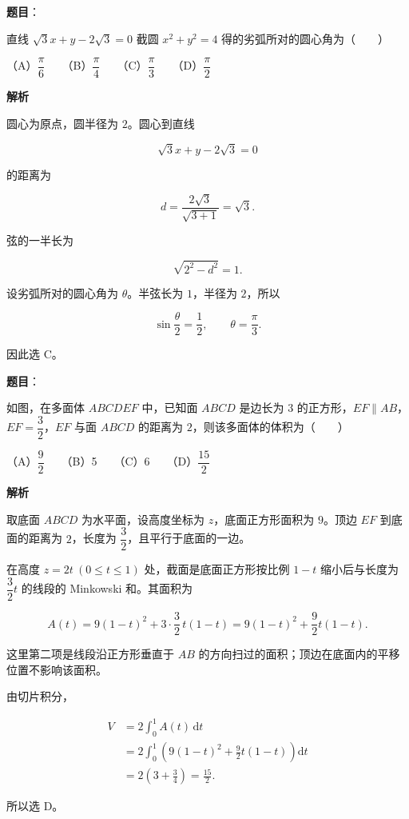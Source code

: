\begin{answer}

\textbf{题目}：

直线 $\sqrt3x+y-2\sqrt3=0$ 截圆 $x^2+y^2=4$ 得的劣弧所对的圆心角为\mbox{（　　）}

（A）$\dfrac\pi6$　　（B）$\dfrac\pi4$　　（C）$\dfrac\pi3$　　（D）$\dfrac\pi2$

\textbf{解析}

圆心为原点，圆半径为 $2$。圆心到直线

\nopagebreak[4]
\[
\sqrt3x+y-2\sqrt3=0
\]

的距离为

\nopagebreak[4]
\[
d=\frac{2\sqrt3}{\sqrt{3+1}}=\sqrt3.
\]

弦的一半长为

\nopagebreak[4]
\[
\sqrt{2^2-d^2}=1.
\]

设劣弧所对的圆心角为 $\theta$。半弦长为 $1$，半径为 $2$，所以

\nopagebreak[4]
\[
\sin\frac\theta2=\frac12,\qquad \theta=\frac\pi3.
\]

因此选 C。


\end{answer}
\begin{answer}

\textbf{题目}：

如图，在多面体 $ABCDEF$ 中，已知面 $ABCD$ 是边长为 $3$ 的正方形，$EF\parallel AB$，$EF=\dfrac32$，$EF$ 与面 $ABCD$ 的距离为 $2$，则该多面体的体积为\mbox{（　　）}
\nopagebreak[4]
\begin{center}\end{center}
\nopagebreak[4]
（A）$\dfrac92$　　（B）5　　（C）6　　（D）$\dfrac{15}2$

\textbf{解析}

取底面 $ABCD$ 为水平面，设高度坐标为 $z$，底面正方形面积为 $9$。顶边 $EF$ 到底面的距离为 $2$，长度为 $\dfrac32$，且平行于底面的一边。

在高度 $z=2t\ (0\le t\le1)$ 处，截面是底面正方形按比例 $1-t$ 缩小后与长度为 $\dfrac32t$ 的线段的 Minkowski 和。其面积为

\nopagebreak[4]
\[
A(t)=9(1-t)^2+3\cdot\frac32\,t(1-t)
=9(1-t)^2+\frac92t(1-t).
\]

这里第二项是线段沿正方形垂直于 $AB$ 的方向扫过的面积；顶边在底面内的平移位置不影响该面积。

由切片积分，

\nopagebreak[4]
\[
\begin{aligned}
V
&=2\int_0^1A(t)\,\mathrm dt\\
&=2\int_0^1\left(9(1-t)^2+\frac92t(1-t)\right)\mathrm dt\\
&=2\left(3+\frac34\right)
=\frac{15}{2}.
\end{aligned}
\]

所以选 D。


\end{answer}
